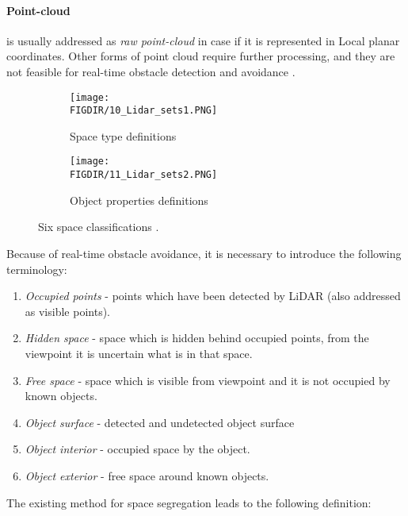 \paragraph{Point-cloud} is usually addressed as \textit{raw point-cloud} in case if it is represented in Local planar coordinates. Other forms of point cloud require further processing, and they are not feasible for real-time obstacle detection and avoidance \cite{chen2007airborne}.

\begin{figure}[H]
    
    \begin{subfigure}{0.45\textwidth}
        \centering
        \texttt{[image: \\FIGDIR/10\_Lidar\_sets1.PNG]} 
        \caption{Space type definitions}
        \label{fig:Spacetypes}
    \end{subfigure}
    \begin{subfigure}{0.45\textwidth}
        \centering
        \texttt{[image: \\FIGDIR/11\_Lidar\_sets2.PNG]}
        \caption{Object properties definitions}
        \label{fig:ObectProperties}
    \end{subfigure}
    
    \caption{Six space classifications \cite{yapo2008probabilistic}.}
    \label{fig:Spaces of interests}
 \end{figure}
 
\noindent  Because of real-time obstacle avoidance, it is necessary to introduce the following terminology:
\begin{enumerate}
    \item \textit{Occupied points} - points which have been detected by LiDAR (also addressed as visible points).
    \item \textit{Hidden space} - space which is hidden behind occupied points, from the viewpoint it is uncertain what is in that space. 
    \item \textit{Free space} - space which is visible from viewpoint and it is not occupied by known objects.
    \item \textit{Object surface} - detected and undetected object surface
    \item \textit{Object interior} - occupied space by the object.
    \item \textit{Object exterior} - free space around known objects.
\end{enumerate}

\noindent The existing method for space segregation \cite{yapo2008probabilistic} leads to the following definition:

